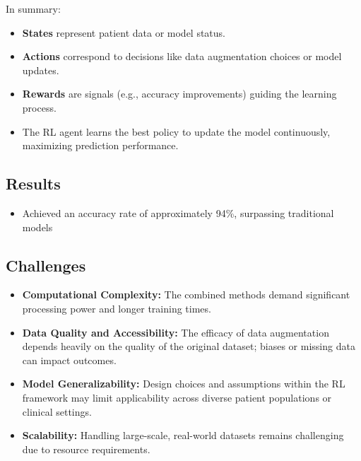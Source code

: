 \noindent In summary:
\begin{itemize}
    \item \textbf{States} represent patient data or model status.
    \item \textbf{Actions} correspond to decisions like data augmentation choices or model updates.
    \item \textbf{Rewards} are signals (e.g., accuracy improvements) guiding the learning process.
    \item The RL agent learns the best policy to update the model continuously, maximizing prediction performance.
\end{itemize}

\subsection*{Results}
\begin{itemize}
    \item Achieved an accuracy rate of approximately 94\%, surpassing traditional models
\end{itemize}

\subsection*{Challenges}
\begin{itemize}
    \item \textbf{Computational Complexity:} The combined methods demand significant processing power and longer training times.
    \item \textbf{Data Quality and Accessibility:} The efficacy of data augmentation depends heavily on the quality of the original dataset; biases or missing data can impact outcomes.
    \item \textbf{Model Generalizability:} Design choices and assumptions within the RL framework may limit applicability across diverse patient populations or clinical settings.
    \item \textbf{Scalability:} Handling large-scale, real-world datasets remains challenging due to resource requirements.
\end{itemize}

